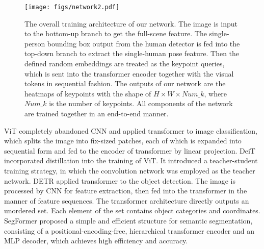 \documentclass[runningheads]{llncs}
\begin{document}
\begin{figure*}
  \centering
  \texttt{[image: figs/network2.pdf]} 
  \caption{The overall training architecture of our network. The image is input to the bottom-up branch to get the full-scene feature. The single-person bounding box output from the human detector is fed into the top-down branch to extract the single-human pose feature. Then the defined random embeddings are treated as the keypoint queries, which is sent into the transformer encoder together with the visual tokens in sequential fashion. The outputs of our network are the heatmaps of keypoints with the shape of $H \times W \times Num\_k$, where $Num\_k$ is the number of keypoints. All components of the network are trained together in an end-to-end manner.}
  \label{overall_architecture}
\end{figure*}

ViT \cite{VIT2020} completely abandoned CNN and applied transformer to image classification, which splits the image into fix-sized patches, each of which is expanded into sequential form and fed to the encoder of transformer by linear projection. DeiT \cite{DEiT2021} incorporated distillation into the training of ViT. It introduced a teacher-student training strategy, in which the convolution network was employed as the teacher network. 
DETR \cite{DETR2020} applied transformer to the object detection. The image is processed by CNN for feature extraction, then fed into the transformer in the manner of feature sequences. The transformer architecture directly outputs an unordered set. Each element of the set contains object categories and coordinates. SegFormer \cite{segformer2021} proposed a simple and efficient structure for semantic segmentation, consisting of a positional-encoding-free, hierarchical transformer encoder and an MLP decoder, which achieves high efficiency and accuracy.
\end{document}
